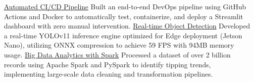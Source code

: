 
\begin{cvprojects}
  \cvproject
    {\href{https://marcodifrancesco.com/CalendarAnalyzer/}{Automated CI/CD Pipeline}}
    {Built an end-to-end DevOps pipeline using GitHub Actions and Docker to automatically test, containerize, and deploy a Streamlit dashboard with zero manual intervention.}
    {}
    {}
  \cvproject
    {\href{https://github.com/MarcoDiFrancesco/probe-detection}{Real-time Object Detection}}
    {Developed a real-time YOLOv11 inference engine optimized for Edge deployment (Jetson Nano), utilizing ONNX compression to achieve 59 FPS with 94MB memory usage.}
    {}
    {}
  \cvproject
    {\href{https://marcodifrancesco.com/NYCTaxis/}{Big Data Analytics with Spark}}
    {Processed a dataset of over 2 billion records using Apache Spark and PySpark to identify tipping trends, implementing large-scale data cleaning and transformation pipelines.}
    {}
    {}
\end{cvprojects}

